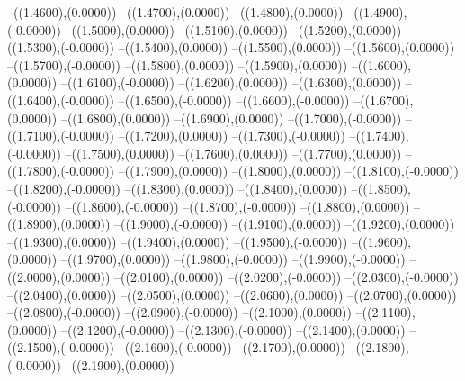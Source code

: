 {	--({\sx*(1.4600)},{\sy*(0.0000)})
	--({\sx*(1.4700)},{\sy*(0.0000)})
	--({\sx*(1.4800)},{\sy*(0.0000)})
	--({\sx*(1.4900)},{\sy*(-0.0000)})
	--({\sx*(1.5000)},{\sy*(0.0000)})
	--({\sx*(1.5100)},{\sy*(0.0000)})
	--({\sx*(1.5200)},{\sy*(0.0000)})
	--({\sx*(1.5300)},{\sy*(-0.0000)})
	--({\sx*(1.5400)},{\sy*(0.0000)})
	--({\sx*(1.5500)},{\sy*(0.0000)})
	--({\sx*(1.5600)},{\sy*(0.0000)})
	--({\sx*(1.5700)},{\sy*(-0.0000)})
	--({\sx*(1.5800)},{\sy*(0.0000)})
	--({\sx*(1.5900)},{\sy*(0.0000)})
	--({\sx*(1.6000)},{\sy*(0.0000)})
	--({\sx*(1.6100)},{\sy*(-0.0000)})
	--({\sx*(1.6200)},{\sy*(0.0000)})
	--({\sx*(1.6300)},{\sy*(0.0000)})
	--({\sx*(1.6400)},{\sy*(-0.0000)})
	--({\sx*(1.6500)},{\sy*(-0.0000)})
	--({\sx*(1.6600)},{\sy*(-0.0000)})
	--({\sx*(1.6700)},{\sy*(0.0000)})
	--({\sx*(1.6800)},{\sy*(0.0000)})
	--({\sx*(1.6900)},{\sy*(0.0000)})
	--({\sx*(1.7000)},{\sy*(-0.0000)})
	--({\sx*(1.7100)},{\sy*(-0.0000)})
	--({\sx*(1.7200)},{\sy*(0.0000)})
	--({\sx*(1.7300)},{\sy*(-0.0000)})
	--({\sx*(1.7400)},{\sy*(-0.0000)})
	--({\sx*(1.7500)},{\sy*(0.0000)})
	--({\sx*(1.7600)},{\sy*(0.0000)})
	--({\sx*(1.7700)},{\sy*(0.0000)})
	--({\sx*(1.7800)},{\sy*(-0.0000)})
	--({\sx*(1.7900)},{\sy*(0.0000)})
	--({\sx*(1.8000)},{\sy*(0.0000)})
	--({\sx*(1.8100)},{\sy*(-0.0000)})
	--({\sx*(1.8200)},{\sy*(-0.0000)})
	--({\sx*(1.8300)},{\sy*(0.0000)})
	--({\sx*(1.8400)},{\sy*(0.0000)})
	--({\sx*(1.8500)},{\sy*(-0.0000)})
	--({\sx*(1.8600)},{\sy*(-0.0000)})
	--({\sx*(1.8700)},{\sy*(-0.0000)})
	--({\sx*(1.8800)},{\sy*(0.0000)})
	--({\sx*(1.8900)},{\sy*(0.0000)})
	--({\sx*(1.9000)},{\sy*(-0.0000)})
	--({\sx*(1.9100)},{\sy*(0.0000)})
	--({\sx*(1.9200)},{\sy*(0.0000)})
	--({\sx*(1.9300)},{\sy*(0.0000)})
	--({\sx*(1.9400)},{\sy*(0.0000)})
	--({\sx*(1.9500)},{\sy*(-0.0000)})
	--({\sx*(1.9600)},{\sy*(0.0000)})
	--({\sx*(1.9700)},{\sy*(0.0000)})
	--({\sx*(1.9800)},{\sy*(-0.0000)})
	--({\sx*(1.9900)},{\sy*(-0.0000)})
	--({\sx*(2.0000)},{\sy*(0.0000)})
	--({\sx*(2.0100)},{\sy*(0.0000)})
	--({\sx*(2.0200)},{\sy*(-0.0000)})
	--({\sx*(2.0300)},{\sy*(-0.0000)})
	--({\sx*(2.0400)},{\sy*(0.0000)})
	--({\sx*(2.0500)},{\sy*(0.0000)})
	--({\sx*(2.0600)},{\sy*(0.0000)})
	--({\sx*(2.0700)},{\sy*(0.0000)})
	--({\sx*(2.0800)},{\sy*(-0.0000)})
	--({\sx*(2.0900)},{\sy*(-0.0000)})
	--({\sx*(2.1000)},{\sy*(0.0000)})
	--({\sx*(2.1100)},{\sy*(0.0000)})
	--({\sx*(2.1200)},{\sy*(-0.0000)})
	--({\sx*(2.1300)},{\sy*(-0.0000)})
	--({\sx*(2.1400)},{\sy*(0.0000)})
	--({\sx*(2.1500)},{\sy*(-0.0000)})
	--({\sx*(2.1600)},{\sy*(-0.0000)})
	--({\sx*(2.1700)},{\sy*(0.0000)})
	--({\sx*(2.1800)},{\sy*(-0.0000)})
	--({\sx*(2.1900)},{\sy*(0.0000)})
}
